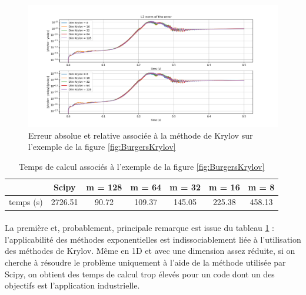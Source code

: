 \begin{figure}[h!]
        \centering
        \includegraphics[width=\textwidth]{images/ErreurKrylov.png}
        \caption{Erreur absolue et relative associée à la méthode de Krylov sur l'exemple de la figure \ref{fig:BurgersKrylov}}
        \label{fig:Krylov}
\end{figure}

\begin{table}[h!]
\centering
\begin{tabular}{c|c|c|c|c|c|c|}
\cline{2-7}                            & \multicolumn{1}{c|}{\cellcolor[HTML]{C0C0C0}Scipy} & \multicolumn{1}{c|}{\cellcolor[HTML]{C0C0C0}m = 128} & \multicolumn{1}{c|}{\cellcolor[HTML]{C0C0C0}m = 64} & \multicolumn{1}{c|}{\cellcolor[HTML]{C0C0C0}m = 32} & \multicolumn{1}{c|}{\cellcolor[HTML]{C0C0C0}m = 16} & \multicolumn{1}{c|}{\cellcolor[HTML]{C0C0C0}m = 8} \\ \hline
\multicolumn{1}{|l|}{\cellcolor[HTML]{EFEFEF}temps (s)} & 2726.51 & 90.72 & 109.37 & 145.05 & 225.38 & 458.13 \\ \hline
\end{tabular}
\caption{Temps de calcul associés à l'exemple de la figure \ref{fig:BurgersKrylov}}
\label{tab:Krylov}
\end{table}

\paragraph{}
La première et, probablement, principale remarque est issue du tableau \ref{tab:Krylov} : l'applicabilité des méthodes exponentielles est indissociablement liée à l'utilisation des méthodes de Krylov. Même en 1D et avec une dimension assez réduite, si on cherche à résoudre le problème uniquement à l'aide de la méthode utilisée par Scipy, on obtient des temps de calcul trop élevés pour un code dont un des objectifs est l'application industrielle.

